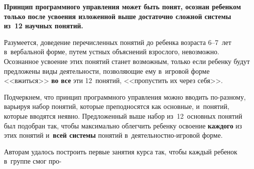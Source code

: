 \begin{multicols}{2}
  \textbf{Принцип программного управления может быть понят, осознан 
ребенком только после усвоения изложенной выше достаточно сложной 
системы из~12 научных понятий.}
   
  Разумеется, доведение перечисленных понятий до ребенка возраста 6--7~лет 
в~вербальной форме, путем устных объяснений взрослого, невозможно. 
Осознанное усвоение этих понятий станет возможным, только если ребенку 
будут предложены виды деятельности, позволяющие ему в~игровой форме 
<<вжиться>> \textbf{во все} эти 12~понятий, <<пропустить их через себя>>. 


  
  Подчеркнем, что принцип программного управ\-ле\-ния можно вводить 
 по-раз\-но\-му, варьируя набор понятий, которые преподносятся как основные, и~понятий, которые вводятся неявно. Предложенный выше набор 
из~12~основных понятий был подобран так, чтобы максимально облегчить 
ребенку освоение \textbf{каждого} из этих понятий и~\textbf{всей системы} 
понятий в~дея\-тель\-ност\-но-иг\-ро\-вой форме. 

  
  
  Авторам удалось построить первые занятия курса так, 
  чтобы каждый ребенок в~группе смог 
  про-\linebreak\vspace*{-12pt}
  
  \pagebreak
  
  \end{multicols}
  
  \begin{figure*} %
\vspace*{1pt}
 \begin{center}
 \mbox{%
 \epsfxsize=163mm 
 }
 \end{center}
   \vspace*{-9pt}
\vspace*{18pt}
 \begin{center}
 \mbox{%
 \epsfxsize=149.668mm 
 }
 \end{center}
   \vspace*{-9pt}
\end{figure*}


